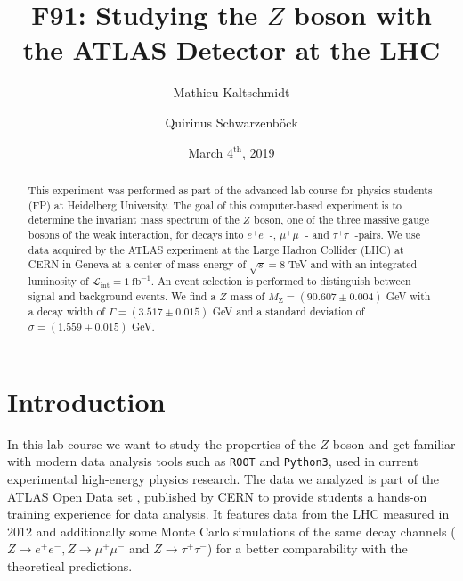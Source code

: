 \documentclass[twocolumn,
			   showpacs,%
               nofootinbib,
               aps,%
               prd,
               notitlepage,
               showkeys,
               10pt]{revtex4-1}
\begin{document}
{\hypersetup{allcolors=black}
\title{F91: Studying the $Z$ boson with the ATLAS Detector at the LHC }
\author{Mathieu Kaltschmidt}
\author{Quirinus Schwarzenb\"ock}

\date[Carried out in the week of  ]{March 4$^{\text{th}}$, 2019}


\begin{abstract}
This experiment was performed as part of the advanced lab course for physics students (FP) at Heidelberg University.
The goal of this computer-based experiment is to determine the invariant mass spectrum of the $Z$ boson, one of the three massive gauge bosons of the weak interaction, for decays into $e^+e^-$-, $\mu^+\mu^-$- and $\tau^+\tau^-$-pairs. We use data acquired by the ATLAS experiment at the Large Hadron Collider (LHC) at CERN in Geneva at a center-of-mass energy of $\sqrt{s} = 8 $ TeV and with an integrated luminosity of $\mathcal{L}_{\text{int}} = 1 \ \text{fb}^{-1}$. An event selection is performed to distinguish between signal and background events. We find a $Z$ mass of $M_{\mathrm{Z}} = (90.607 \pm 0.004)$ GeV with a decay width of $\Gamma = (3.517 \pm 0.015)$ GeV and a standard deviation of $\sigma = (1.559 \pm 0.015)$ GeV.
\end{abstract}

\maketitle


}
\section{Introduction}
In this lab course we want to study the properties of the $Z$ boson and get familiar with modern data analysis tools such as \verb|ROOT| and \verb|Python3|, used in current experimental high-energy physics research. The data we analyzed is part of the ATLAS Open Data set \cite{DATA}, published by CERN to provide students a hands-on training experience for data analysis. It features data from the LHC measured in 2012 and additionally some Monte Carlo simulations of the same decay channels ($Z\rightarrow e^+e^-,Z\rightarrow \mu^+\mu^-$ and $Z\rightarrow \tau^+\tau^-$) for a better comparability with the theoretical predictions.
\end{document}
